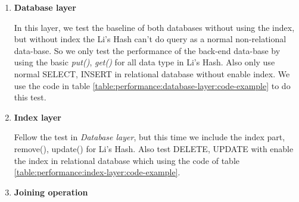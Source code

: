 
\begin{enumerate}



\item \textbf{Database layer}

In this layer, we test the baseline of both databases without using the index, but without index the Li's Hash can't do query as a normal non-relational data-base. So we only test the performance of the back-end data-base by using the basic \textit{put()}, \textit{get()} for all data type in Li's Hash. Also only use normal SELECT, INSERT in relational database without enable index. We use the code in table \ref{table:performance:database-layer:code-example} to do this test.\\





\clearpage


\item \textbf{Index layer}

Fellow the test in \textit{Database layer}, but this time we include the index part, remove(), update() for Li's Hash. Also test DELETE, UPDATE with enable the index in relational database which using the code of table \ref{table:performance:index-layer:code-example}.\\





\clearpage


\item \textbf{Joining operation}


\end{enumerate}
